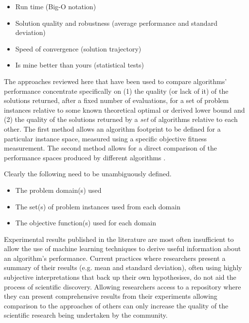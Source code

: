 \documentclass[a4paper]{article}
\begin{document}
\begin{itemize}
\item Run time (Big-O notation)
\item Solution quality and robustness (average performance and standard deviation)
\item Speed of convergence (solution trajectory)
\item Is mine better than yours (statistical tests)
\end{itemize}

The approaches reviewed here that have been used to compare algorithms' performance concentrate specifically  on (1) the quality (or lack of it) of the solutions returned, after a fixed number of evaluations, for a set of problem instances relative to some known theoretical optimal or derived lower bound and (2) the quality of the solutions returned by a \emph{set} of algorithms relative to each other.
The first method allows an algorithm footprint to be defined for a particular instance space, measured using a specific objective fitness measurement.
The second method allows for a direct comparison of the performance spaces produced by different algorithms .  

Clearly the following need to be unambiguously defined. 

\begin{itemize}
\item The problem domain(s) used
\item The set(s) of problem instances used from each domain
\item The objective function(s) used for each domain
\end{itemize}

Experimental results published in the literature are most often insufficient to allow the use of machine learning techniques to derive useful information about an algorithm's performance.
Current practices where researchers present a summary of their results (e.g. mean and standard deviation), often using highly subjective interpretations that back up their own hypothesises, do not aid the process of scientific discovery.
Allowing researchers access to a repository where they can present comprehensive results from their experiments allowing comparison to the approaches of others can only increase the quality of the scientific research being undertaken by the community.

%
\end{document}
